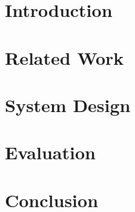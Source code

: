 \documentclass{article}
\title{}
\author{}
\date{}
\begin{document}
\maketitle

\begin{abstract}
\end{abstract}

\section{Introduction}

\section{Related Work}

\section{System Design}

\section{Evaluation}

\section{Conclusion}



\end{document}

